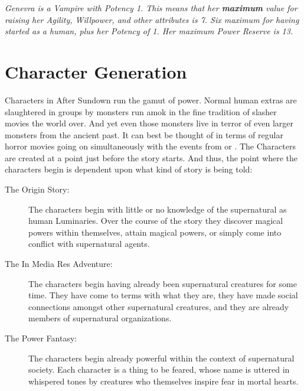 \medskip

\textit{Genevra is a Vampire with Potency 1. This means that her \textbf{maximum} value for raising her Agility, Willpower, and other attributes is 7. Six maximum for having started as a human, plus her Potency of 1. Her maximum Power Reserve is 13.}

\section{Character Generation}

Characters in After Sundown run the gamut of power. Normal human extras are slaughtered in groups by monsters run amok in the fine tradition of slasher movies the world over.  And yet even those monsters live in terror of even larger monsters from the ancient past. It can best be thought of in terms of regular horror movies going on simultaneously with the events from  or . The Characters are created at a point just before the story starts. And thus, the point where the characters begin is dependent upon what kind of story is being told:

\begin{description}
\item[The Origin Story:] The characters begin with little or no knowledge of the supernatural as human Luminaries. Over the course of the story they discover magical powers within themselves, attain magical powers, or simply come into conflict with supernatural agents.

\item[The In Media Res Adventure:] The characters begin having already been supernatural creatures for some time. They have come to terms with what they are, they have made social connections amongst other supernatural creatures, and they are already members of supernatural organizations.

\item[The Power Fantasy:] The characters begin already powerful within the context of supernatural society. Each character is a thing to be feared, whose name is uttered in whispered tones by creatures who themselves inspire fear in mortal hearts.
\end{description}

